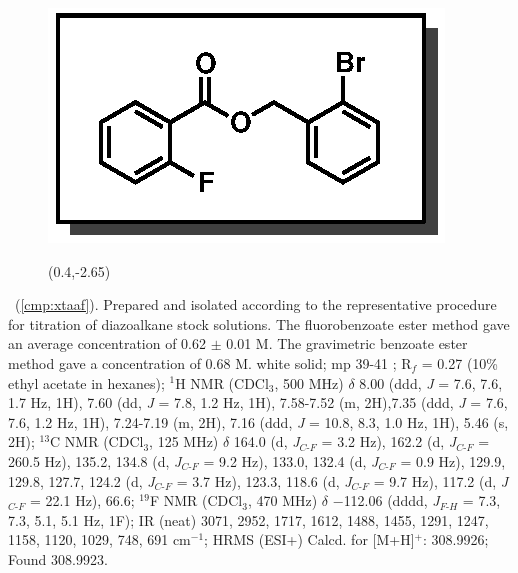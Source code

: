 \pagebreak
\begin{figure}
  \vspace{-18pt}
  \begin{center}
    \includegraphics[scale=0.8]{chp_asymmetric/images/xtaaf}
          \begin{textblock}{1}(0.4,-2.65)  \end{textblock}
  \end{center}
  \vspace{-35pt}
\end{figure}\noindent \textbf{\CMPxtaaf}\ (\ref{cmp:xtaaf}). Prepared and
isolated according to the representative procedure for titration of diazoalkane
stock solutions. The fluorobenzoate ester method gave an average concentration
of 0.62 $\pm$ 0.01 M. The gravimetric benzoate ester method gave a concentration
of 0.68 M. white solid; mp 39-41 \degc; R$_f$ = 0.27 (10\% ethyl acetate in
hexanes); $^1$H NMR (CDCl$_3$, 500 MHz) $\delta$ 8.00 (ddd, \textit{J} = 7.6, 7.6, 1.7 Hz, 1H),
7.60 (dd, \textit{J} = 7.8, 1.2 Hz, 1H), 7.58-7.52 (m, 2H),7.35 (ddd, \textit{J}
= 7.6, 7.6, 1.2 Hz, 1H), 7.24-7.19 (m, 2H), 7.16 (ddd, \textit{J} = 10.8, 8.3,
1.0 Hz, 1H), 5.46 (s, 2H); $^{13}$C NMR (CDCl$_3$, 125 MHz) $\delta$ 164.0 (d,
\textit{J}$_{C\mbox{-}F}$ = 3.2 Hz), 162.2 (d, \textit{J}$_{C\mbox{-}F}$ = 260.5
Hz), 135.2, 134.8 (d, \textit{J}$_{C\mbox{-}F}$ = 9.2 Hz), 133.0, 132.4 (d,
\textit{J}$_{C\mbox{-}F}$ = 0.9 Hz), 129.9, 129.8, 127.7, 124.2 (d,
\textit{J}$_{C\mbox{-}F}$ = 3.7 Hz), 123.3, 118.6 (d, \textit{J}$_{C\mbox{-}F}$
= 9.7 Hz), 117.2 (d, \textit{J}$_{C\mbox{-}F}$ = 22.1 Hz), 66.6; $^{19}$F NMR
(CDCl$_3$, 470 MHz) $\delta$ $-$112.06 (dddd, \textit{J}$_{F\mbox{-}H}$ = 7.3,
7.3, 5.1, 5.1 Hz, 1F); IR (neat) 3071, 2952, 1717, 1612, 1488, 1455, 1291, 1247,
1158, 1120, 1029, 748, 691 cm$^{-1}$; HRMS (ESI+) Calcd. for 
[M+H]$^+$: 308.9926; Found 308.9923.

